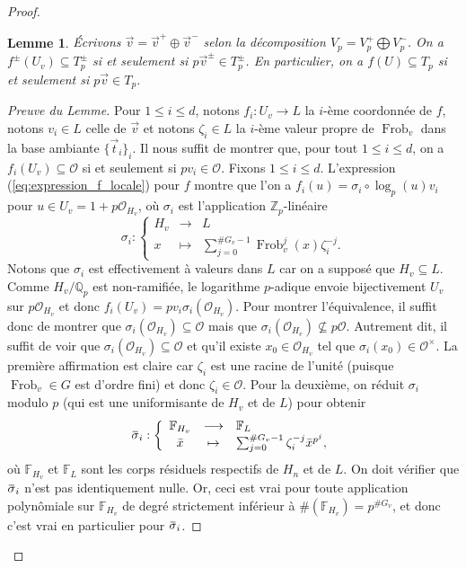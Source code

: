 \documentclass[10pt,a4paper]{amsart}
\newtheorem{lemme}{Lemme}
\DeclareMathOperator{\Frob}{Frob}
\newcommand\Qp{\mathbb{Q}_{p}}
\newcommand\Zp{{\mathbb{Z}_{p}}}
\newcommand\bF{\mathbb{F}}
\newcommand\cO{\mathcal{O}}
\newcommand{\ob}[1]{\mkern 1.5mu\overline{\mkern-1.5mu#1\mkern-1.5mu}\mkern 1.5mu}
\begin{document}
\begin{proof}
	\begin{lemme}
		\'Ecrivons $\vec{v}=\vec{v}^+ \oplus \vec{v}^-$ selon la décomposition $V_p=V_p^+\bigoplus V_p^-$. On a $f^\pm(U_v) \subseteq T_p^\pm$ si et seulement si $p \vec{v}^\pm \in T_p^\pm$. En particulier, on a $f(U)\subseteq T_p$ si et seulement si $p\vec{v}\in T_p$.
	\end{lemme}
	\begin{proof}[Preuve du Lemme]
		 Pour $1\leq i \leq d$, notons $f_i:U_v \longrightarrow L$ la $i$-ème coordonnée de $f$, notons $v_i \in L$ celle de $\vec{v}$ et notons $\zeta_i\in L$ la $i$-ème valeur propre de $\Frob_v$ dans la base ambiante $\{\vec{t}_i\}_i$. Il nous suffit de montrer que, pour tout $1\leq i \leq d$, on a $f_i(U_v)\subseteq \cO$ si et seulement si $pv_i\in \cO$. Fixons $1\leq i \leq d$. L'expression (\ref{eq:expression_f_locale}) pour $f$ montre que l'on a $f_i(u)=\sigma_i\circ \log_p(u) v_i$ pour $u\in U_v=1+p\cO_{H_v}$, où $\sigma_i$ est l'application $\Zp$-linéaire $$\sigma_i :  \left\{\begin{array}{ccl} H_v & \longrightarrow & L \\
		  x&\mapsto & \sum_{j=0}^{\#G_v-1}\Frob^{j}_v(x)\zeta_i^{-j}. 
		  \end{array}\right.$$ 
		 Notons que $\sigma_i$ est effectivement à valeurs dans $L$ car on a supposé que $H_v\subseteq L$. Comme $H_v/\Qp$ est non-ramifiée, le logarithme $p$-adique envoie bijectivement $U_v$ sur $p\cO_{H_v}$ et donc $f_i(U_v)=pv_i\sigma_i\left(\cO_{H_v}\right)$. Pour montrer l'équivalence, il suffit donc de montrer que $\sigma_i\left(\cO_{H_v}\right)\subseteq \cO$ mais que $\sigma_i\left(\cO_{H_v}\right) \not\subseteq p\cO$. Autrement dit, il suffit de voir que $\sigma_i\left(\cO_{H_v}\right)\subseteq \cO$ et qu'il existe $x_0\in\cO_{H_v}$ tel que $\sigma_i(x_0)\in\cO^\times$. La première affirmation est claire car $\zeta_i$ est une racine de l'unité (puisque $\Frob_v\in G$ est d'ordre fini) et donc $\zeta_i\in \cO$. Pour la deuxième, on réduit $\sigma_i$ modulo $p$ (qui est une uniformisante de $H_v$ et de $L$) pour obtenir 
		 $$\ob{\sigma}_i :  \left\{\begin{array}{ccl} \bF_{H_v} & \longrightarrow & \bF_{L} \\
		 \bar{x}&\mapsto & \sum_{j=0}^{\#G_v-1}\zeta_i^{-j}\bar{x}^{p^j}, 
		 \end{array}\right.$$ 
		 où $\bF_{H_v}$ et $\bF_{L}$ sont les corps résiduels respectifs de $H_n$ et de $L$. On doit vérifier que $\ob{\sigma}_i$ n'est pas identiquement nulle. Or, ceci est vrai pour toute application polynômiale sur $\bF_{H_v}$ de degré strictement inférieur à $\#\left(\bF_{H_v}\right)=p^{\#G_v}$, et donc c'est vrai en particulier pour $\ob{\sigma}_i$.

\end{proof}
\end{proof}
\end{document}
